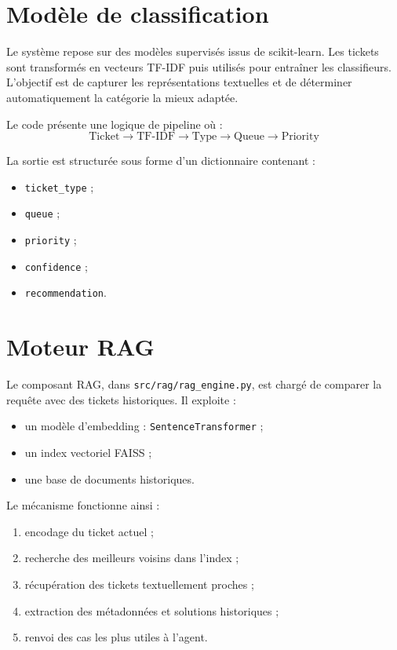 \documentclass[11pt,a4paper]{report}
\begin{document}
\section{Modèle de classification}
Le système repose sur des modèles supervisés issus de scikit-learn. Les tickets sont transformés en vecteurs TF-IDF puis utilisés pour entraîner les classifieurs. L’objectif est de capturer les représentations textuelles et de déterminer automatiquement la catégorie la mieux adaptée.

Le code présente une logique de pipeline où :
\begin{equation}
\text{Ticket} \rightarrow \text{TF-IDF} \rightarrow \text{Type} \rightarrow \text{Queue} \rightarrow \text{Priority}
\end{equation}

La sortie est structurée sous forme d’un dictionnaire contenant :
\begin{itemize}[leftmargin=1.3em]
    \item \texttt{ticket\_type} ;
    \item \texttt{queue} ;
    \item \texttt{priority} ;
    \item \texttt{confidence} ;
    \item \texttt{recommendation}.
\end{itemize}

\section{Moteur RAG}
Le composant RAG, dans \texttt{src/rag/rag\_engine.py}, est chargé de comparer la requête avec des tickets historiques. Il exploite :
\begin{itemize}[leftmargin=1.3em]
    \item un modèle d’embedding : \texttt{SentenceTransformer} ;
    \item un index vectoriel FAISS ;
    \item une base de documents historiques.
\end{itemize}

Le mécanisme fonctionne ainsi :
\begin{enumerate}[leftmargin=1.8em]
    \item encodage du ticket actuel ;
    \item recherche des meilleurs voisins dans l’index ;
    \item récupération des tickets textuellement proches ;
    \item extraction des métadonnées et solutions historiques ;
    \item renvoi des cas les plus utiles à l’agent.
\end{enumerate}
\end{document}
